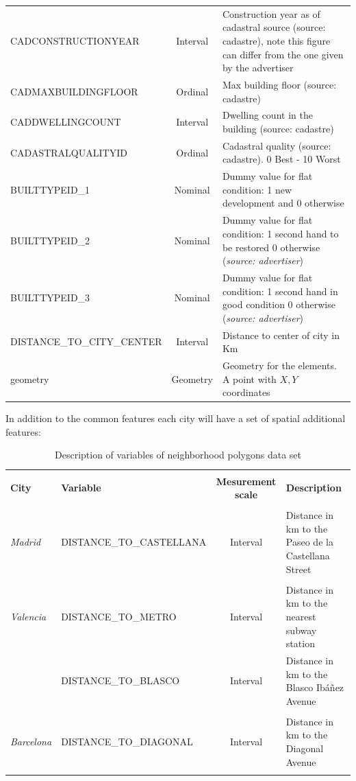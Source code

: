 \documentclass[times,final]{elsarticle}
\begin{document}
\begin{footnotesize}
\begin{longtable}{p{40mm} c p{63mm}}
CADCONSTRUCTIONYEAR & Interval & Construction year as of cadastral source (source: cadastre), note this figure can differ from the one given by the advertiser\\
CADMAXBUILDINGFLOOR & Ordinal & Max building floor (source: cadastre)\\
CADDWELLINGCOUNT & Interval & Dwelling count in the building (source: cadastre)\\
CADASTRALQUALITYID & Ordinal & Cadastral quality (source: cadastre). 0 Best - 10 Worst\\
BUILTTYPEID\_1 & Nominal & Dummy value for flat condition: 1 new development and 0 otherwise\\
BUILTTYPEID\_2 & Nominal & Dummy value for flat condition: 1 second hand to be restored 0 otherwise (\emph{source: advertiser})\\
BUILTTYPEID\_3 & Nominal & Dummy value for flat condition: 1 second hand in good condition 0 otherwise (\emph{source: advertiser})\\
DISTANCE\_TO\_CITY\_CENTER & Interval & Distance to center of city in Km\\
geometry & Geometry & Geometry for the elements. A point with $X,Y$ coordinates\\
\hline
\hline
\end{longtable}
\end{footnotesize}

In addition to the common features each city will have a set of spatial additional features:

\begin{footnotesize}
\begin{longtable}{l p{40mm} c p{63mm}}
\caption{Description of variables of neighborhood polygons data set} \\
\hline
\hline
& & &\\
\textbf{City} & \textbf{Variable} & \textbf{Mesurement scale} & \textbf{Description}\\
\hline
& & &\\
\emph{Madrid} & DISTANCE\_TO\_CASTELLANA & Interval & Distance in km to the Paseo de la Castellana Street \\
& & &\\
\emph{Valencia} & DISTANCE\_TO\_METRO & Interval & Distance in km to the nearest subway station \\
 & DISTANCE\_TO\_BLASCO & Interval & Distance in km to the Blasco Ibáñez Avenue \\
& & &\\
\emph{Barcelona} & DISTANCE\_TO\_DIAGONAL & Interval & Distance in km to the Diagonal Avenue \\
& & &\\
\hline
\hline
\hline
\end{longtable}
\end{footnotesize}
\end{document}
